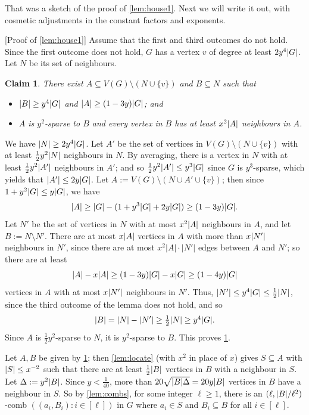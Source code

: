 \documentclass[11pt,reqno,a4paper]{amsart}
\newtheorem{claim}{Claim}[theorem]
\let\oldendproof\endproof
\renewenvironment{proof}[1][\proofname]{%
	\oldproof[\normalfont\bfseries #1]%
}{\oldendproof}
\renewcommand{\qedsymbol}{$\blacksquare$}%
\newenvironment{subproof}[1][\normalfont\it Subproof]{%
	\renewcommand{\qedsymbol}{$\square$}%
	\begin{proof}[#1]%
	}{%
	\end{proof}%
}
\renewcommand{\subset}{\subseteq}
\DeclarePairedDelimiter\abs{\lvert}{\rvert}%
\begin{document}
	That was a sketch of the proof of \cref{lem:house1}.
	Next we will write it out, with cosmetic adjustments in the constant factors and exponents.
	\begin{proof}
		[Proof of \cref{lem:house1}]
		Assume that the first and third outcomes do not hold.
		Since the first outcome does not hold, $G$ has a vertex $v$ of degree at least $2y^4\abs G$. Let $N$ be its set of neighbours.
		
		\begin{claim}
			\label{claim:house1}
			There exist $A\subseteq V(G)\setminus (N\cup \{v\})$ and $B\subseteq N$ such that
			\begin{itemize}
				\item $\abs B\ge y^4\abs G$ and $\abs A\ge (1-3y)\abs G$; and
				
				\item $A$ is $y^2$-sparse to $B$ and every vertex in $B$ has at least $x^2\abs A$ neighbours in $A$.
			\end{itemize}
		\end{claim}
		
		\begin{subproof}
			We have $\abs N\ge 2y^4\abs G$.
			Let $A'$ be the set of vertices in $V(G)\setminus(N\cup\{v\})$ with at least $\frac12y^2\abs N$ neighbours in $N$.
			By averaging, there is a vertex in $N$ with at least $\frac12y^2\abs{A'}$ neighbours in ${A'}$;
			and so $\frac12y^2\abs{A'}\le y^3\abs G$ since $G$ is $y^3$-sparse,  which yields that $\abs{A'}\le 2y\abs G$.
			Let $A:=V(G)\setminus(N\cup A'\cup\{v\})$; then since $1+y^2\abs G\le y\abs G$, we have
			\[\abs A\ge \abs G-(1+y^3\abs G+2y\abs G)
			\ge (1-3y)\abs G.\]
			Let $N'$ be the set of vertices in $N$ with at most $x^2\abs A$ neighbours in $A$, and let $B:=N\setminus N'$.
			There are at most $x\abs A$ vertices in $A$ with more than $x\abs{N'}$ neighbours in $N'$, since there are at most $x^2|A|\cdot |N'|$ edges between $A$ and $N'$; so there are at least
			\[\abs A-x\abs A\ge (1-3y)\abs G-x\abs G\ge (1-4y)\abs G\]
			vertices in $A$ with at most $x\abs{N'}$ neighbours in $N'$.
			Thus, $\abs {N'}\le y^4\abs G\le \frac12\abs N$, since the third outcome of the lemma does not hold, and so
			\[\abs B=\abs N-\abs{N'}\ge \textstyle\frac12\abs N\ge y^4\abs G.\]
			Since $A$ is $\frac12y^2$-sparse to $N$, it is $y^2$-sparse to $B$.
			This proves \cref{claim:house1}.
		\end{subproof}
		
		Let $A,B$ be given by \cref{claim:house1};
		then \cref{lem:locate} (with $x^2$ in place of $x$) gives $S\subset A$ with $\abs S\le x^{-2}$ such that there are 
		at least $\frac12\abs B$ vertices in $B$ with a neighbour in $S$.
		Let $\Delta:=y^2\abs B$.
		Since $y<\frac1{40}$, more than 
		$20\sqrt{\abs B\Delta}=20y\abs B$ vertices in $B$ have a neighbour in $S$. So by 
		\cref{lem:combs},
		for some integer $\ell\ge1$, there is an $(\ell,\abs B/\ell^2)$-comb $((a_i,B_i):i\in[\ell])$ in $G$ where $a_i\in S$ and $B_i\subset B$ for all $i\in[\ell]$.
		

\end{proof}
\end{document}
